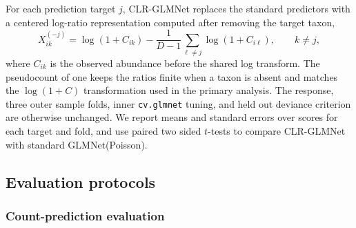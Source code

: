 \documentclass[USenglish]{article}
\theoremstyle{dgthm}
\begin{document}
For each prediction target \(j\), CLR-GLMNet replaces the standard predictors with a centered log-ratio representation computed after removing the target taxon,
\[
X_{ik}^{(-j)}
=
\log(1+C_{ik})
-
\frac{1}{D-1}\sum_{\ell\neq j}\log(1+C_{i\ell}),
\qquad k\neq j,
\]
where \(C_{ik}\) is the observed abundance before the shared log transform.
The pseudocount of one keeps the ratios finite when a taxon is absent and matches the \(\log(1+C)\) transformation used in the primary analysis.
The response, three outer sample folds, inner \texttt{cv.glmnet} tuning, and held out deviance criterion are otherwise unchanged.
We report means and standard errors over scores for each target and fold, and use paired two sided $t$-tests to compare CLR-GLMNet with standard GLMNet(Poisson).

\subsection{Evaluation protocols}
\label{subsec:evaluation-protocols}

\subsubsection{Count-prediction evaluation}
\end{document}
